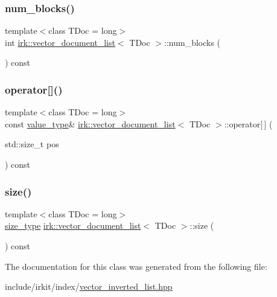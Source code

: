 \subsubsection{\texorpdfstring{num\+\_\+blocks()}{num\_blocks()}}
{\footnotesize\ttfamily template$<$class T\+Doc  = long$>$ \\
int \mbox{\hyperlink{classirk_1_1vector__document__list}{irk\+::vector\+\_\+document\+\_\+list}}$<$ T\+Doc $>$\+::num\+\_\+blocks (\begin{DoxyParamCaption}{ }\end{DoxyParamCaption}) const\hspace{0.3cm}{\ttfamily [inline]}}

\mbox{\label{classirk_1_1vector__document__list_a005d5854e07f49ade87827544cc88d7f}} 
\subsubsection{\texorpdfstring{operator[]()}{operator[]()}}
{\footnotesize\ttfamily template$<$class T\+Doc  = long$>$ \\
const \mbox{\hyperlink{classirk_1_1vector__document__list_a0ec9c56f5e12a3a9101b5a18b2fbe69f}{value\+\_\+type}}\& \mbox{\hyperlink{classirk_1_1vector__document__list}{irk\+::vector\+\_\+document\+\_\+list}}$<$ T\+Doc $>$\+::operator\mbox{[}$\,$\mbox{]} (\begin{DoxyParamCaption}\item[{std\+::size\+\_\+t}]{pos }\end{DoxyParamCaption}) const\hspace{0.3cm}{\ttfamily [inline]}}

\mbox{\label{classirk_1_1vector__document__list_ad7eac494d9c0aa784efaa1a4faa47616}} 
\subsubsection{\texorpdfstring{size()}{size()}}
{\footnotesize\ttfamily template$<$class T\+Doc  = long$>$ \\
\mbox{\hyperlink{classirk_1_1vector__document__list_ac9387bd9f5dc89b638b6295858a9268c}{size\+\_\+type}} \mbox{\hyperlink{classirk_1_1vector__document__list}{irk\+::vector\+\_\+document\+\_\+list}}$<$ T\+Doc $>$\+::size (\begin{DoxyParamCaption}{ }\end{DoxyParamCaption}) const\hspace{0.3cm}{\ttfamily [inline]}}



The documentation for this class was generated from the following file\+:\begin{DoxyCompactItemize}
\item 
include/irkit/index/\mbox{\hyperlink{vector__inverted__list_8hpp}{vector\+\_\+inverted\+\_\+list.\+hpp}}\end{DoxyCompactItemize}
